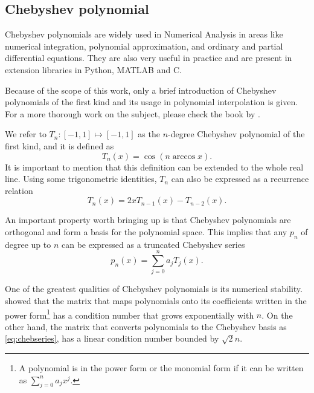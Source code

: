 \subsection{Chebyshev polynomial}

Chebyshev polynomials are widely used in Numerical Analysis in areas like numerical integration, polynomial approximation, and ordinary and partial differential equations.
They are also very useful in practice and are present in extension libraries in Python, MATLAB and C.

Because of the scope of this work, only a brief introduction of Chebyshev polynomials of the first kind and its usage in polynomial interpolation is given. For a more thorough work on the subject, please check the book by .

We refer to $T_n : [-1, 1] \mapsto [-1, 1]$ as the $n$-degree Chebyshev polynomial of the first kind, and it is defined as
\begin{equation}
T_n(x) = \cos({n\arccos x}).
\end{equation}
It is important to mention that this definition can be extended to the whole real line. Using some trigonometric identities, $T_n$ can also be expressed as a recurrence relation
\begin{equation}
T_n(x) = 2xT_{n-1}(x) - T_{n-2}(x).
\end{equation}

An important property worth bringing up is that Chebyshev polynomials are orthogonal and form a basis for the polynomial space. This implies that any $p_n$ of degree up to $n$ can be expressed as a truncated Chebyshev series
\begin{equation}\label{eq:chebseries}
p_n(x) = \sum_{j=0}^{n} a_j T_j(x).
\end{equation}

One of the greatest qualities of Chebyshev polynomials is its numerical stability.  showed that the matrix that maps polynomials onto its coefficients written in the power form\footnote{A polynomial is in the power form or the monomial form if it can be written as $\sum_{j=0}^{n}a_jx^j$.} has a condition number that grows exponentially with $n$. On the other hand, the matrix that converts polynomials to the Chebyshev basis as \autoref{eq:chebseries}, has a linear condition number bounded by $\sqrt{2}n$.

